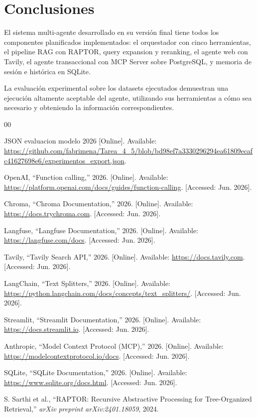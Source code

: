 \documentclass[conference]{IEEEtran}
\begin{document}
\section{Conclusiones}

El sistema multi-agente desarrollado en su versión final tiene todos los componentes planificados implementados: el orquestador con cinco herramientas, el pipeline RAG con RAPTOR, query expansion y reranking, el agente web con Tavily, el agente transaccional con MCP Server sobre PostgreSQL, y memoria de sesión e histórica en SQLite.

La evaluación experimental sobre los datasets ejecutados demuestran una ejecución altamente aceptable del agente, utilizando sus herramientas a cómo sea necesario y obteniendo la información correspondientes.

\begin{thebibliography}{00}

JSON evaluacion modelo 2026 [Online]. Available: \url{https://github.com/fabrimena/Tarea_4_5/blob/bd98ef7a3330296294ea61809ecafc41627698e6/experimentos_export.json}.

OpenAI, ``Function calling,'' 2026. [Online]. Available: \url{https://platform.openai.com/docs/guides/function-calling}. [Accessed: Jun. 2026].

Chroma, ``Chroma Documentation,'' 2026. [Online]. Available: \url{https://docs.trychroma.com}. [Accessed: Jun. 2026].

Langfuse, ``Langfuse Documentation,'' 2026. [Online]. Available: \url{https://langfuse.com/docs}. [Accessed: Jun. 2026].

Tavily, ``Tavily Search API,'' 2026. [Online]. Available: \url{https://docs.tavily.com}. [Accessed: Jun. 2026].

LangChain, ``Text Splitters,'' 2026. [Online]. Available: \url{https://python.langchain.com/docs/concepts/text_splitters/}. [Accessed: Jun. 2026].

Streamlit, ``Streamlit Documentation,'' 2026. [Online]. Available: \url{https://docs.streamlit.io}. [Accessed: Jun. 2026].

Anthropic, ``Model Context Protocol (MCP),'' 2026. [Online]. Available: \url{https://modelcontextprotocol.io/docs}. [Accessed: Jun. 2026].

SQLite, ``SQLite Documentation,'' 2026. [Online]. Available: \url{https://www.sqlite.org/docs.html}. [Accessed: Jun. 2026].

S. Sarthi et al., ``RAPTOR: Recursive Abstractive Processing for Tree-Organized Retrieval,'' \textit{arXiv preprint arXiv:2401.18059}, 2024.

\end{thebibliography}
\end{document}
